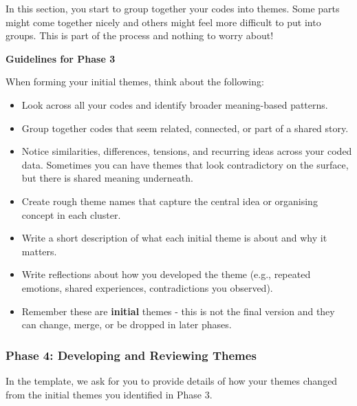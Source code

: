 \documentclass[
  english,
  letterpaper,
  DIV=11,
  numbers=noendperiod]{scrreprt}
\providecommand{\tightlist}{%
  \setlength{\itemsep}{0pt}\setlength{\parskip}{0pt}}
\begin{document}
In this section, you start to group together your codes into themes.
Some parts might come together nicely and others might feel more
difficult to put into groups. This is part of the process and nothing to
worry about!

\textbf{Guidelines for Phase 3}

When forming your initial themes, think about the following:

\begin{itemize}
\tightlist
\item
  Look across all your codes and identify broader meaning-based
  patterns.
\item
  Group together codes that seem related, connected, or part of a shared
  story.
\item
  Notice similarities, differences, tensions, and recurring ideas across
  your coded data. Sometimes you can have themes that look contradictory
  on the surface, but there is shared meaning underneath.
\item
  Create rough theme names that capture the central idea or organising
  concept in each cluster.
\item
  Write a short description of what each initial theme is about and why
  it matters.
\item
  Write reflections about how you developed the theme (e.g., repeated
  emotions, shared experiences, contradictions you observed).
\item
  Remember these are \textbf{initial} themes - this is not the final
  version and they can change, merge, or be dropped in later phases.
\end{itemize}

\subsubsection{Phase 4: Developing and Reviewing
Themes}\label{phase-4-developing-and-reviewing-themes}

\begin{tcolorbox}[enhanced jigsaw, breakable, bottomtitle=1mm, leftrule=.75mm, opacityback=0, colbacktitle=quarto-callout-important-color!10!white, opacitybacktitle=0.6, toprule=.15mm, colback=white, left=2mm, coltitle=black, bottomrule=.15mm, titlerule=0mm, title=\textcolor{quarto-callout-important-color}{\faExclamation}\hspace{0.5em}{Phase 4: What is asked for?}, toptitle=1mm, colframe=quarto-callout-important-color-frame, arc=.35mm, rightrule=.15mm]

In the template, we ask for you to provide details of how your themes
changed from the initial themes you identified in Phase 3.

\end{tcolorbox}
\end{document}
